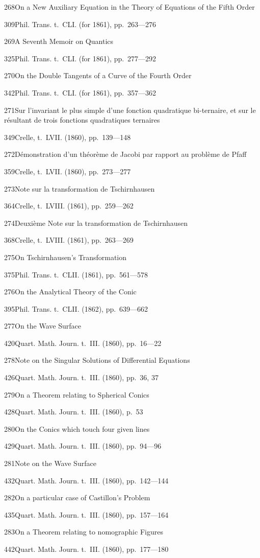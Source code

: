 \documentclass[11pt,a4paper]{book}
\providecommand{\tocentry}[2]{#1\dotfill #2\par}
\begin{document}
\tocentry{268}{On a New Auxiliary Equation in the Theory of Equations of the Fifth Order}{309}{Phil. Trans. t.~CLI. (for 1861), pp.~263---276}

\tocentry{269}{A Seventh Memoir on Quantics}{325}{Phil. Trans. t.~CLI. (for 1861), pp.~277---292}

\tocentry{270}{On the Double Tangents of a Curve of the Fourth Order}{342}{Phil. Trans. t.~CLI. (for 1861), pp.~357---362}

\tocentry{271}{Sur l'invariant le plus simple d'une fonction quadratique bi-ternaire, et sur le r\'{e}sultant de trois fonctions quadratiques ternaires}{349}{Crelle, t.~LVII. (1860), pp.~139---148}

\tocentry{272}{D\'{e}monstration d'un th\'{e}or\`{e}me de Jacobi par rapport au probl\`{e}me de Pfaff}{359}{Crelle, t.~LVII. (1860), pp.~273---277}

\tocentry{273}{Note sur la transformation de Tschirnhausen}{364}{Crelle, t.~LVIII. (1861), pp.~259---262}

\tocentry{274}{Deuxi\`{e}me Note sur la transformation de Tschirnhausen}{368}{Crelle, t.~LVIII. (1861), pp.~263---269}

\tocentry{275}{On Tschirnhausen's Transformation}{375}{Phil. Trans. t.~CLII. (1861), pp.~561---578}

\tocentry{276}{On the Analytical Theory of the Conic}{395}{Phil. Trans. t.~CLII. (1862), pp.~639---662}

\tocentry{277}{On the Wave Surface}{420}{Quart. Math. Journ. t.~III. (1860), pp.~16---22}

\tocentry{278}{Note on the Singular Solutions of Differential Equations}{426}{Quart. Math. Journ. t.~III. (1860), pp.~36, 37}

\newpage

\tocentry{279}{On a Theorem relating to Spherical Conics}{428}{Quart. Math. Journ. t.~III. (1860), p.~53}

\tocentry{280}{On the Conics which touch four given lines}{429}{Quart. Math. Journ. t.~III. (1860), pp.~94---96}

\tocentry{281}{Note on the Wave Surface}{432}{Quart. Math. Journ. t.~III. (1860), pp.~142---144}

\tocentry{282}{On a particular case of Castillon's Problem}{435}{Quart. Math. Journ. t.~III. (1860), pp.~157---164}

\tocentry{283}{On a Theorem relating to nomographic Figures}{442}{Quart. Math. Journ. t.~III. (1860), pp.~177---180}
\end{document}
